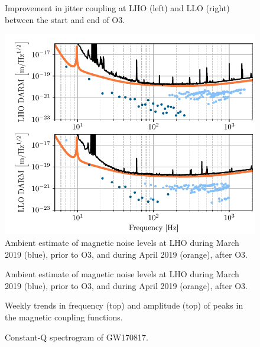 \documentclass[11pt]{article}
\begin{document}
\begin{figure}
	\centering
	\caption{Improvement in jitter coupling at LHO (left) and LLO (right) between the start and end of O3.}
	\label{fig:jitter}
\end{figure}

\begin{figure}[h]
	\centering
	\includegraphics[width=\textwidth]{figures/ambient_mag.pdf}
	\caption{
		Ambient estimate of magnetic noise levels at LHO during March 2019 (blue), prior to O3, and during April 2019 (orange), after O3.}
	\label{fig:ambient-mag}
\end{figure}

\begin{figure}
	\centering
	\caption{
		Ambient estimate of magnetic noise levels at LHO during March 2019 (blue), prior to O3, and during April 2019 (orange), after O3.}
	\label{fig:weekly-mag-preO3}
\end{figure}

\begin{figure}
	\centering
	\caption{Weekly trends in frequency (top) and amplitude (top) of peaks in the magnetic coupling functions.}
	\label{fig:weekly-mag-variation}
\end{figure}

\begin{figure}
	\centering
	\caption{Constant-Q spectrogram of GW170817.}
	\label{fig:vetting_gw170817_spectrogram}
\end{figure}
\end{document}
